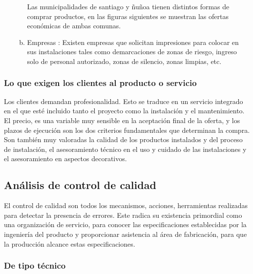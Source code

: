 \begin{enumerate}[1)]
\begin{enumerate}[a)]
Las municipalidades de santiago y ñuñoa tienen distintos formas de comprar productos, en las figuras siguientes se muestran las ofertas económicas de ambas comunas. 



    \item Empresas : Existen empresas que solicitan impresiones para colocar en sus instalaciones tales como demarcaciones de zonas de riesgo, ingreso solo de personal autorizado, zonas de silencio, zonas limpias, etc.



	\end{enumerate}
	\end{enumerate}

	\subsubsection{Lo que exigen los clientes al producto o servicio}
	Los clientes demandan profesionalidad. Esto se traduce en un servicio integrado en el que esté incluido tanto el proyecto como la instalación y el mantenimiento. El precio, es una variable muy sensible en la aceptación final de la oferta, y los plazos de ejecución son los dos criterios fundamentales que determinan la compra. Son también
muy valoradas la calidad de los productos instalados y del proceso de instalación, el
asesoramiento técnico en el uso y cuidado de las instalaciones y el asesoramiento en
aspectos decorativos.
	
	\subsection{Análisis de control de calidad}
		El control de calidad son todos los mecanismos, acciones, herramientas realizadas para detectar la presencia de errores. Este radica su existencia primordial como una organización de servicio, para conocer las especificaciones establecidas por la ingeniería del producto y proporcionar asistencia al área de fabricación, para que la producción alcance estas especificaciones.	


      	\subsubsection{De tipo técnico}
      	
